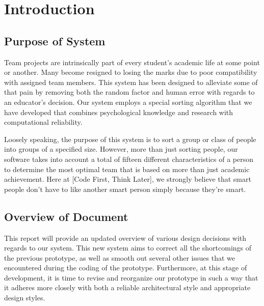 \documentclass[12pt,letterpaper]{article}
\begin{document}
\newpage{}

\tableofcontents{}

\renewcommand{\listfigurename}{Figures}
\listoffigures

\renewcommand{\listtablename}{Tables}
\listoftables

\newpage{}

\section{Introduction}

\subsection{Purpose of System}

Team projects are intrinsically part of every student's academic life at some point or another. Many become resigned to losing the marks due to poor compatibility with assigned team members. This system has been designed to alleviate some of that pain by removing both the random factor and human error with regards to an educator's decision. Our system employs a special sorting algorithm that we have developed that combines psychological knowledge and research with computational reliability.

 Loosely speaking, the purpose of this system is to sort a group or class of people into groups of a specified size. However, more than just sorting people, our software takes into account a total of fifteen different characteristics of a person to determine the most optimal team that is based on more than just academic achievement. Here at [Code First, Think Later], we strongly believe that smart people don't have to like another smart person simply because they're smart.

\subsection{Overview of Document}

This report will provide an updated overview of various design decisions with regards to our system. This new system aims to correct all the shortcomings of the previous prototype, as well as smooth out several other issues that we encountered during the coding of the prototype. Furthermore, at this stage of development, it is time to revise and reorganize our prototype in such a way that it adheres more closely with both a reliable architectural style and appropriate design styles. 
\end{document}
